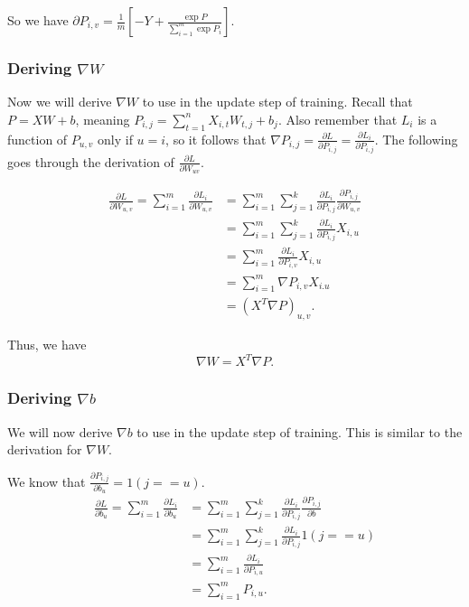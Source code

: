 So we have $\partial P_{i,v} = \frac{1}{m} \left[ -Y +
\frac{\exp{P}}{\sum_{i=1}^m \exp{P_i}} \right]$.

\subsubsection{Deriving $\nabla W$}
Now we will derive $\nabla W$ to use in the update step of training. Recall
that $P = XW + b$, meaning $P_{i, j} = \sum_{t=1}^n X_{i, t}W_{t, j} + b_j $.
Also remember that $L_i$ is a function of $P_{u, v}$ only if $u = i$, so it
follows that $\nabla P_{i, j} = \frac{\partial L}{\partial P_{i, j}} =
\frac{\partial L_i}{\partial P_{i, j}}$. The following goes through the
derivation of $\frac{\partial L}{\partial W_{uv}}$.

\begin{align*} 
     \frac{\partial L}{\partial W_{u, v}} = 
     \sum_{i=1}^m \frac{\partial L_i}{\partial W_{u, v}} &= 
     \sum_{i=1}^m \sum_{j=1}^k \frac{\partial L_i}{\partial P_{i, j}}
       \frac{\partial P_{i, j}}{\partial W_{u, v}}\\
     &= \sum_{i=1}^m \sum_{j=1}^k
         \frac{\partial L_i}{\partial P_{i, j}} X_{i, u}\\
     &= \sum_{i=1}^m \frac{\partial L_i}{\partial P_{i, v}} X_{i, u}\\
     &= \sum_{i=1}^m \nabla P_{i, v} X_{i. u}\\
     &= \left( X^T \nabla P \right)_{u, v}.
\end{align*}

Thus, we have
$$ \nabla W = X^T \nabla P. $$

\subsubsection{Deriving $\nabla b$}
We will now derive $\nabla b$ to use in the update step of training. This is
similar to the derivation for $\nabla W$.

We know that $\frac{\partial P_{i,j}}{\partial b_u} = 1(j == u).$
\begin{align*} 
  \frac{\partial L}{\partial b_u} = 
  \sum_{i=1}^m \frac{\partial L_i}{\partial b_u} &= 
  \sum_{i=1}^m \sum_{j=1}^k \frac{\partial L_i}{\partial P_{i, j}}
  \frac{\partial P_{i, j}}{\partial b}\\
  &= \sum_{i=1}^m \sum_{j=1}^k \frac{\partial L_i}{\partial P_{i, j}} 1(j == u)\\
  &= \sum_{i=1}^m \frac{\partial L_i}{\partial P_{i,u}} \\
  &= \sum_{i=1}^m P_{i,u}.
\end{align*}


